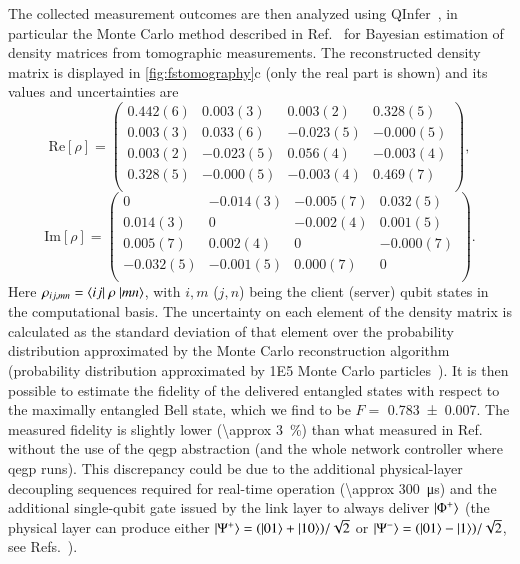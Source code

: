 The collected measurement outcomes are then analyzed using QInfer~\cite{granade_2017_qinfer}, in
particular the Monte Carlo method described in Ref.~\cite{granade_2016_practical} for Bayesian
estimation of density matrices from tomographic measurements. The reconstructed density matrix is
displayed in \cref{fig:fstomography}c (only the real part is shown) and its values and uncertainties
are
%
\begin{equation*}
    \mathrm{Re}[\rho] = \begin{pmatrix}
        0.442(6) & 0.003(3)  & 0.003(2)  & 0.328(5)  \\
        0.003(3) & 0.033(6)  & -0.023(5) & -0.000(5) \\
        0.003(2) & -0.023(5) & 0.056(4)  & -0.003(4) \\
        0.328(5) & -0.000(5) & -0.003(4) & 0.469(7)  \\
    \end{pmatrix},
\end{equation*}
%
\begin{equation*}
    \mathrm{Im}[\rho] = \begin{pmatrix}
        0         & -0.014(3) & -0.005(7) & 0.032(5)  \\
        0.014(3)  & 0         & -0.002(4) & 0.001(5)  \\
        0.005(7)  & 0.002(4)  & 0         & -0.000(7) \\
        -0.032(5) & -0.001(5) & 0.000(7)  & 0         \\
    \end{pmatrix}.
\end{equation*}
Here $\rho_{ij, mn} = \braket{ij|\ \rho\ |mn}$, with $i,m$ ($j,n$) being the client (server) qubit
states in the computational basis. The uncertainty on each element of the density matrix is
calculated as the standard deviation of that element over the probability distribution approximated
by the Monte Carlo reconstruction algorithm (probability distribution approximated by \num{1E5}
Monte Carlo particles~\cite{granade_2016_practical}). It is then possible to estimate the fidelity
of the delivered entangled states with respect to the maximally entangled Bell state, which we find
to be $F =$ \num{0.783(7)}. The measured fidelity is slightly lower (\qty{\approx 3}{\percent}) than
what measured in Ref.~\cite{pompili_2021_multinode} without the use of the \acrshort{qegp}
abstraction (and the whole network controller where \acrshort{qegp} runs). This discrepancy could be
due to the additional physical-layer decoupling sequences required for real-time operation
(\qty{\approx 300}{\us}) and the additional single-qubit gate issued by the link layer to always
deliver $\ket{\Phi^+}$ (the physical layer can produce either $\ket{\Psi^+} = (\ket{01} +
    \ket{10})/\sqrt{2}$ or $\ket{\Psi^-} = (\ket{01} - \ket{1})/ \sqrt{2}$, see
Refs.~\cite{humphreys_2018_delivery, pompili_2021_multinode}).

